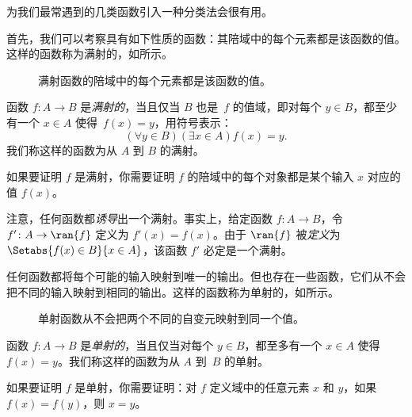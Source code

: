 \documentclass[../../../include/open-logic-section]{subfiles}
\begin{document}

\begin{explain}
为我们最常遇到的几类函数引入一种分类法会很有用。

首先，我们可以考察具有如下性质的函数：其陪域中的每个元素都是该函数的值。这样的函数称为满射的，如所示。

\begin{figure}
  \caption{满射函数的陪域中的每个元素都是该函数的值。}
\end{figure}
\end{explain}

\begin{defn}[满射函数]
函数 $f \colon A \rightarrow B$ 是\emph{满射的}，当且仅当 $B$ 也是~$f$ 的值域，即对每个 $y \in B$，都至少有一个 $x \in A$ 使得~$f(x) = y$，用符号表示：
\[
  (\forall y \in B)(\exists x \in A)f(x) = y.
\]
我们称这样的函数为从 $A$ 到 $B$ 的满射。
\end{defn}

\begin{explain}
如果要证明 $f$ 是满射，你需要证明 $f$ 的陪域中的每个对象都是某个输入 $x$ 对应的值 $f(x)$。

注意，任何函数都\emph{诱导}出一个满射。事实上，给定函数 $f \colon A \to B$，令 $f' \colon A \to \ran{f}$ 定义为 $f'(x) = f(x)$。由于 $\ran{f}$ 被\emph{定义}为 $\Setabs{f(x) \in B}{x \in A}$，该函数 $f'$ 必定是一个满射。
\end{explain}

\begin{explain}
任何函数都将每个可能的输入映射到唯一的输出。但也存在一些函数，它们从不会把不同的输入映射到相同的输出。这样的函数称为单射的，如所示。
\begin{figure}
  \caption{单射函数从不会把两个不同的自变元映射到同一个值。}
\end{figure}
\end{explain}

\begin{defn}[单射函数]
函数 $f \colon A \rightarrow B$ 是\emph{单射的}，当且仅当对每个 $y \in B$，都至多有一个 $x \in A$ 使得~$f(x) = y$。我们称这样的函数为从 $A$ 到~$B$ 的单射。
\end{defn}

\begin{explain}
如果要证明 $f$ 是单射，你需要证明：对 $f$ 定义域中的任意元素 $x$ 和 $y$，如果 $f(x)=f(y)$，则 $x=y$。
\end{explain}
\end{document}
